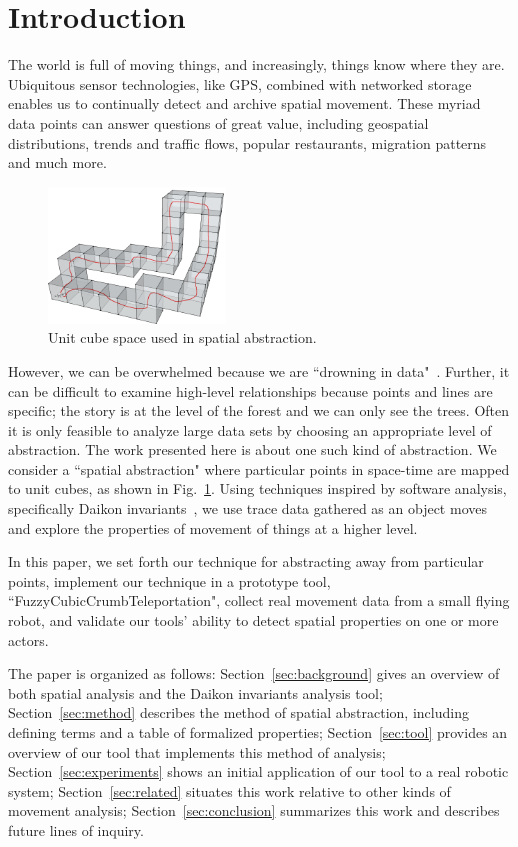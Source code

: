\section{Introduction}

The world is full of moving things, and increasingly, things know where they are. 
Ubiquitous sensor technologies, like GPS, combined with networked storage enables us to continually detect and archive spatial movement.
These myriad data points can answer questions of great value, including geospatial distributions, trends and traffic flows, popular restaurants, migration patterns and much more.

\begin{figure}
  \centering
  \includegraphics[width=0.42\textwidth]{./figures/path_overview}
  \caption{Unit cube space used in spatial abstraction.}
  \label{fig:unitCubes}
\end{figure}

However, we can be overwhelmed because we are ``drowning in data"~\cite{morse1993drowning}.
Further, it can be difficult to examine high-level relationships because points and lines are specific; the story is at the level of the forest and we can only see the trees.  
Often it is only feasible to analyze large data sets by choosing an appropriate level of abstraction.
The work presented here is about one such kind of abstraction.
We consider a ``spatial abstraction" where particular points in space-time are mapped to unit cubes, as shown in Fig.~\ref{fig:unitCubes}.
Using techniques inspired by software analysis, specifically Daikon invariants~\cite{kataoka2001automated}, we use trace data gathered as an object moves and explore the properties of movement of things at a higher level.

In this paper, we set forth our technique for abstracting away from particular points, 
implement our technique in a prototype tool, ``FuzzyCubicCrumbTeleportation", 
collect real movement data from a small flying robot, 
and validate our tools' ability to detect spatial properties on one or more actors.

The paper is organized as follows:
Section~\ref{sec:background} gives an overview of both spatial analysis and the Daikon invariants analysis tool;
Section~\ref{sec:method} describes the method of spatial abstraction, including defining terms and a table of formalized properties;
Section~\ref{sec:tool} provides an overview of our tool that implements this method of analysis;
Section~\ref{sec:experiments} shows an initial application of our tool to a real robotic system;
Section~\ref{sec:related} situates this work relative to other kinds of movement analysis;
Section~\ref{sec:conclusion} summarizes this work and describes future lines of inquiry. 




